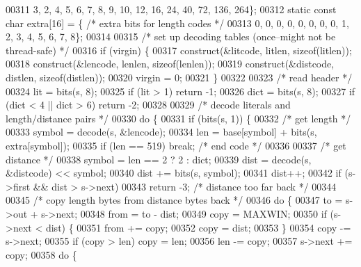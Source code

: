 \begin{DoxyCode}
00311         3, 2, 4, 5, 6, 7, 8, 9, 10, 12, 16, 24, 40, 72, 136, 264\};
00312     \textcolor{keyword}{static} \textcolor{keyword}{const} \textcolor{keywordtype}{char} extra[16] = \{     \textcolor{comment}{/* extra bits for length codes */}
00313         0, 0, 0, 0, 0, 0, 0, 0, 1, 2, 3, 4, 5, 6, 7, 8\};
00314 
00315     \textcolor{comment}{/* set up decoding tables (once--might not be thread-safe) */}
00316     \textcolor{keywordflow}{if} (virgin) \{
00317         construct(&litcode, litlen, \textcolor{keyword}{sizeof}(litlen));
00318         construct(&lencode, lenlen, \textcolor{keyword}{sizeof}(lenlen));
00319         construct(&distcode, distlen, \textcolor{keyword}{sizeof}(distlen));
00320         virgin = 0;
00321     \}
00322 
00323     \textcolor{comment}{/* read header */}
00324     lit = bits(s, 8);
00325     \textcolor{keywordflow}{if} (lit > 1) \textcolor{keywordflow}{return} -1;
00326     dict = bits(s, 8);
00327     \textcolor{keywordflow}{if} (dict < 4 || dict > 6) \textcolor{keywordflow}{return} -2;
00328 
00329     \textcolor{comment}{/* decode literals and length/distance pairs */}
00330     \textcolor{keywordflow}{do} \{
00331         \textcolor{keywordflow}{if} (bits(s, 1)) \{
00332             \textcolor{comment}{/* get length */}
00333             symbol = decode(s, &lencode);
00334             len = base[symbol] + bits(s, extra[symbol]);
00335             \textcolor{keywordflow}{if} (len == 519) \textcolor{keywordflow}{break};              \textcolor{comment}{/* end code */}
00336 
00337             \textcolor{comment}{/* get distance */}
00338             symbol = len == 2 ? 2 : dict;
00339             dist = decode(s, &distcode) << symbol;
00340             dist += bits(s, symbol);
00341             dist++;
00342             \textcolor{keywordflow}{if} (s->first && dist > s->next)
00343                 \textcolor{keywordflow}{return} -3;              \textcolor{comment}{/* distance too far back */}
00344 
00345             \textcolor{comment}{/* copy length bytes from distance bytes back */}
00346             \textcolor{keywordflow}{do} \{
00347                 to = s->out + s->next;
00348                 from = to - dist;
00349                 copy = MAXWIN;
00350                 \textcolor{keywordflow}{if} (s->next < dist) \{
00351                     from += copy;
00352                     copy = dist;
00353                 \}
00354                 copy -= s->next;
00355                 \textcolor{keywordflow}{if} (copy > len) copy = len;
00356                 len -= copy;
00357                 s->next += copy;
00358                 \textcolor{keywordflow}{do} \{

\end{DoxyCode}
